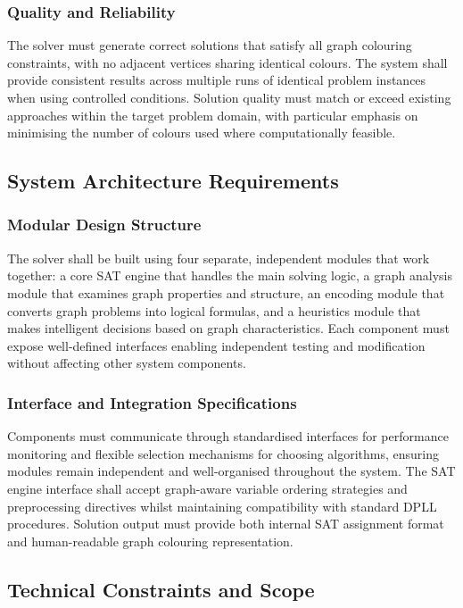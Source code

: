 \subsubsection{Quality and Reliability}
The solver must generate correct solutions that satisfy all graph colouring constraints, with no adjacent vertices sharing identical colours. The system shall provide consistent results across multiple runs of identical problem instances when using controlled conditions. Solution quality must match or exceed existing approaches within the target problem domain, with particular emphasis on minimising the number of colours used where computationally feasible.

\subsection{System Architecture Requirements}

\subsubsection{Modular Design Structure}
The solver shall be built using four separate, independent modules that work together: a core SAT engine that handles the main solving logic, a graph analysis module that examines graph properties and structure, an encoding module that converts graph problems into logical formulas, and a heuristics module that makes intelligent decisions based on graph characteristics. Each component must expose well-defined interfaces enabling independent testing and modification without affecting other system components.

\subsubsection{Interface and Integration Specifications}
Components must communicate through standardised interfaces for performance monitoring and flexible selection mechanisms for choosing algorithms, ensuring modules remain independent and well-organised throughout the system. The SAT engine interface shall accept graph-aware variable ordering strategies and preprocessing directives whilst maintaining compatibility with standard DPLL procedures. Solution output must provide both internal SAT assignment format and human-readable graph colouring representation.

\subsection{Technical Constraints and Scope}

